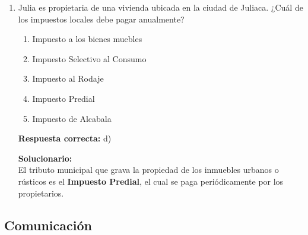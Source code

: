\begin{enumerate}
	\vspace{2mm}
	\textbf{Solucionario:}\\
	El pago que se realiza por recibir un servicio administrativo individualizado del Estado, como el duplicado del DNI, es una \textbf{tasa}. No es multa ni contribución.
	
	\vspace{6mm}
	
	\item Julia es propietaria de una vivienda ubicada en la ciudad de Juliaca. ¿Cuál de los impuestos locales debe pagar anualmente?
	\begin{enumerate}[label=\alph*)]
		\item Impuesto a los bienes muebles
		\item Impuesto Selectivo al Consumo
		\item Impuesto al Rodaje
		\item Impuesto Predial
		\item Impuesto de Alcabala
	\end{enumerate}
	\textbf{Respuesta correcta:} d)
	
	\vspace{2mm}
	\textbf{Solucionario:}\\
	El tributo municipal que grava la propiedad de los inmuebles urbanos o rústicos es el \textbf{Impuesto Predial}, el cual se paga periódicamente por los propietarios.
	
	\vspace{6mm}
	
\end{enumerate}

\subsection*{Comunicación}

